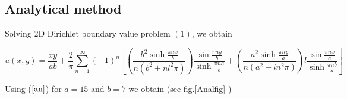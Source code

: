 \subsection*{Analytical method}

Solving 2D Dirichlet  boundary value problem $(1)$, we obtain

\begin{equation}\label{an}
    u(x,y) = \frac{xy}{ab} + \frac{2}{\pi} \sum_{n=1}^{\infty} (-1)^n\left[\left(\frac{b^2 \sinh{\frac{\pi n x }{b}}}{n(b^2 + nl^2\pi)}\right)\frac{\sin{\frac{\pi n y}{b}}}{\sinh{\frac{\pi n a }{b}}} + \left( \frac{a^2 \sinh{\frac{\pi n y }{a}} }{n(a^2 - ln^2\pi)}\right) l\frac{\sin{\frac{\pi n x}{a}}}{\sinh{\frac{\pi n b }{a}}}\right]
\end{equation}

Using ($\ref{an}$)  for $a=15$ and $b=7$ we obtain (see fig.\ref{Analfig} )


